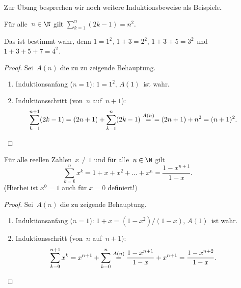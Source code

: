 \documentclass[a4paper]{article}
\begin{document}
Zur Übung besprechen wir noch weitere Induktionsbeweise als Beispiele.

\begin{theorem}
    Für alle~$n \in \N$ gilt $\sum_{k=1}^n (2k-1) = n^2$.
\end{theorem}

Das ist bestimmt wahr, denn $1 = 1^2$, $1+3 = 2^2$, $1+3+5 = 3^2$ und $1+3+5+7 = 4^2$.

\begin{proof}
    Sei~$A(n)$ die zu zu zeigende Behauptung.
    \begin{enumerate}
        \item Induktionsanfang ($n = 1$): $1 = 1^2$, $A(1)$~ist wahr.
        \item Induktionsschritt (von~$n$ auf~$n+1$):
              \begin{equation*}
                  \sum_{k=1}^{n+1} (2k-1) = (2n+1) + \sum_{k=1}^n (2k-1) \overset{A(n)}{=} = (2n+1) + n^2 = (n+1)^2. \qedhere
              \end{equation*}
    \end{enumerate}
\end{proof}

\begin{theorem}
    Für alle reellen Zahlen~$x \neq 1$ und für alle~$n \in \N$ gilt
    \begin{equation*}
        \sum_{k=0}^n x^k = 1 + x + x^2 + \dots + x^n = \frac{1-x^{n+1}}{1-x}.
    \end{equation*}
    (Hierbei ist $x^0 = 1$ auch für $x = 0$ definiert!)
\end{theorem}

\begin{proof}
    Sei~$A(n)$ die zu zeigende Behauptung.
    \begin{enumerate}
        \item Induktionsanfang ($n=1$): $1 + x = (1-x^2) / (1-x)$, $A(1)$~ist wahr.
        \item Induktionsschritt (von~$n$ auf~$n + 1$):
              \begin{equation*}
                  \sum_{k=0}^{n+1} x^k = x^{n+1} + \sum_{k=0}^n \overset{A(n)}{=} \frac{1-x^{n+1}}{1-x} + x^{n+1} = \frac{1-x^{n+2}}{1-x}. \qedhere
              \end{equation*}
    \end{enumerate}
\end{proof}
\end{document}
